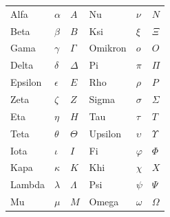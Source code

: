 \documentclass[../../../include/open-logic-chapter]{subfiles}
\begin{document}

\begin{center}
    \begin{tabular}{lll@{\qquad}lll}
    Alfa &	$\alpha$ & $A$ &
    Nu & $\nu$ & $N$ \\
    Beta & $\beta$ & $B$ &
    Ksi & $\xi$ & $\Xi$ \\
    Gama &	$\gamma$ & $\Gamma$ &
    Omikron & $o$ & $O$ \\
    Delta & $\delta$ & $\Delta$ &
    Pi & $\pi$ & $\Pi$ \\
    Epsilon & $\epsilon$ & $E$ &
    Rho & $\rho$ & $P$ \\
    Zeta & $\zeta$ & $Z$ &
    Sigma &	$\sigma$ & $\Sigma$ \\
    Eta & $\eta$ & $H$ &
    Tau & $\tau$ & $T$ \\
    Teta & $\theta$ & $\Theta$ &
    Upsilon & $\upsilon$ & $\Upsilon$ \\
    Iota & $\iota$ & $I$ &
    Fi & $\varphi$ & $\Phi$ \\
    Kapa & $\kappa$ & $K$ &
    Khi & $\chi$ & $X$ \\
    Lambda & $\lambda$ & $\Lambda$ &
    Psi & $\psi$ & $\Psi$ \\
    Mu & $\mu$ & $M$ &
    Omega & $\omega$ & $\Omega$
    \end{tabular}
\end{center}
\end{document}
